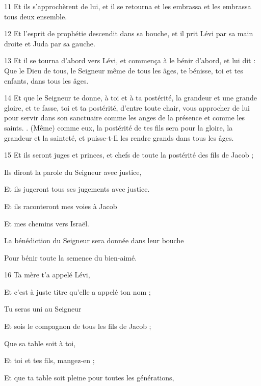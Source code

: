 \par 11 Et ils s'approchèrent de lui, et il se retourna et les embrassa et les embrassa tous deux ensemble.
\par 12 Et l'esprit de prophétie descendit dans sa bouche, et il prit Lévi par sa main droite et Juda par sa gauche.
\par 13 Et il se tourna d'abord vers Lévi, et commença à le bénir d'abord, et lui dit : Que le Dieu de tous, le Seigneur même de tous les âges, te bénisse, toi et tes enfants, dans tous les âges.
\par 14 Et que le Seigneur te donne, à toi et à ta postérité, la grandeur et une grande gloire, et te fasse, toi et ta postérité, d'entre toute chair, vous approcher de lui pour servir dans son sanctuaire comme les anges de la présence et comme les saints. . (Même) comme eux, la postérité de tes fils sera pour la gloire, la grandeur et la sainteté, et puisse-t-Il les rendre grands dans tous les âges.
\par 15 Et ils seront juges et princes, et chefs de toute la postérité des fils de Jacob ;
\par    
\par     Ils diront la parole du Seigneur avec justice,  
\par     Et ils jugeront tous ses jugements avec justice.
\par    
\par     Et ils raconteront mes voies à Jacob  
\par     Et mes chemins vers Israël.
\par    
\par     La bénédiction du Seigneur sera donnée dans leur bouche  
\par     Pour bénir toute la semence du bien-aimé.
\par    
\par 16 Ta mère t'a appelé Lévi,  
\par     Et c’est à juste titre qu’elle a appelé ton nom ;
\par    
\par     Tu seras uni au Seigneur  
\par     Et sois le compagnon de tous les fils de Jacob ;
\par    
\par     Que sa table soit à toi,  
\par     Et toi et tes fils, mangez-en ;
\par    
\par     Et que ta table soit pleine pour toutes les générations,  
